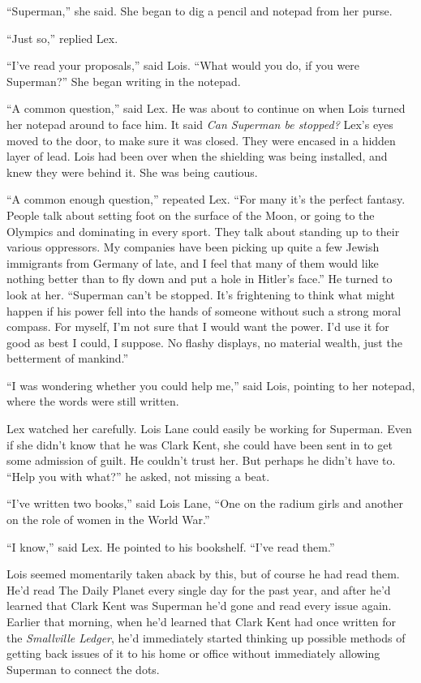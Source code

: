 ``Superman,'' she said. She began to dig a pencil and notepad from her
purse.

``Just so,'' replied Lex.

``I've read your proposals,'' said Lois. ``What would you do, if you
were Superman?'' She began writing in the notepad.

``A common question,'' said Lex. He was about to continue on when Lois
turned her notepad around to face him. It said \emph{Can Superman be
stopped?} Lex's eyes moved to the door, to make sure it was closed. They
were encased in a hidden layer of lead. Lois had been over when the
shielding was being installed, and knew they were behind it. She was
being cautious.

``A common enough question,'' repeated Lex. ``For many it's the perfect
fantasy. People talk about setting foot on the surface of the Moon, or
going to the Olympics and dominating in every sport. They talk about
standing up to their various oppressors. My companies have been picking
up quite a few Jewish immigrants from Germany of late, and I feel that
many of them would like nothing better than to fly down and put a hole
in Hitler's face.'' He turned to look at her. ``Superman can't be
stopped. It's frightening to think what might happen if his power fell
into the hands of someone without such a strong moral compass. For
myself, I'm not sure that I would want the power. I'd use it for good as
best I could, I suppose. No flashy displays, no material wealth, just
the betterment of mankind.''

``I was wondering whether you could help me,'' said Lois, pointing to
her notepad, where the words were still written.

Lex watched her carefully. Lois Lane could easily be working for
Superman. Even if she didn't know that he was Clark Kent, she could have
been sent in to get some admission of guilt. He couldn't trust her. But
perhaps he didn't have to. ``Help you with what?'' he asked, not missing
a beat.

``I've written two books,'' said Lois Lane, ``One on the radium girls
and another on the role of women in the World War.''

``I know,'' said Lex. He pointed to his bookshelf. ``I've read them.''

Lois seemed momentarily taken aback by this, but of course he had read
them. He'd read The Daily Planet every single day for the past year, and
after he'd learned that Clark Kent was Superman he'd gone and read every
issue again. Earlier that morning, when he'd learned that Clark Kent had
once written for the \emph{Smallville Ledger}, he'd immediately started
thinking up possible methods of getting back issues of it to his home or
office without immediately allowing Superman to connect the dots.

